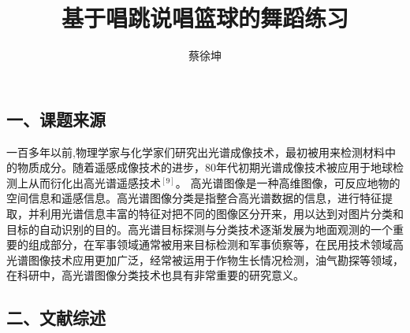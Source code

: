 \documentclass[UTF8,zihao=-4]{oucart}
\title{基于唱跳说唱篮球的舞蹈练习}
\author{蔡徐坤}
\begin{document}
\makecoveror

\newpage

\setcounter{page}{1}

\subsection*{一、课题来源}

\begin{framed}

一百多年以前,物理学家与化学家们研究出光谱成像技术，最初被用来检测材料中的物质成分。随着遥感成像技术的进步，80年代初期光谱成像技术被应用于地球检测上从而衍化出高光谱遥感技术$^{[9]}$。 高光谱图像是一种高维图像，可反应地物的空间信息和遥感信息。高光谱图像分类是指整合高光谱数据的信息，进行特征提取，并利用光谱信息丰富的特征对把不同的图像区分开来，用以达到对图片分类和目标的自动识别的目的。高光谱目标探测与分类技术逐渐发展为地面观测的一个重要的组成部分，在军事领域通常被用来目标检测和军事侦察等，在民用技术领域高光谱图像技术应用更加广泛，经常被运用于作物生长情况检测，油气勘探等领域，在科研中，高光谱图像分类技术也具有非常重要的研究意义。

\end{framed}

\subsection*{二、文献综述}
\end{document}

